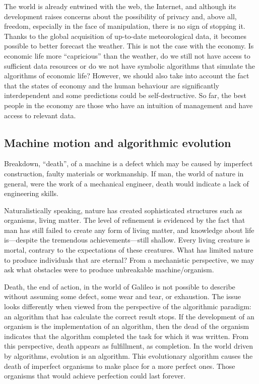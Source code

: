 \documentclass[pdftex,12pt]{article}
\begin{document}
The world is already entwined with the web, the Internet, and although its development raises concerns about the possibility of privacy and, above all, freedom, especially in the face of manipulation, there is no sign of stopping it. Thanks to the global acquisition of up-to-date meteorological data, it becomes possible to better forecast the weather. This is not the case with the economy. Is economic life more ``capricious'' than the weather, do we still not have access to sufficient data resources or do we not have symbolic algorithms that simulate the algorithms of economic life? However, we should also take into account the fact that the states of economy  and the human behaviour are significantly interdependent and some predictions could be self-destructive. So far, the best people in the economy are those who have an intuition of management and have access to relevant data.



\subsection{Machine motion and algorithmic evolution} 

Breakdown, ``death'', of a machine is a defect which may be caused by imperfect construction, faulty materials or workmanship. If man, the world of nature in general, were the work of a mechanical engineer, death would indicate a lack of engineering skills.

Naturalistically speaking, nature has created sophisticated structures such as organisms, living matter. The level of refinement is evidenced by the fact that man has still failed to create any form of living matter, and knowledge about life is---despite the tremendous achievements---still shallow. Every living creature is mortal, contrary to the expectations of these creatures. What has limited nature to produce individuals that are eternal? From a mechanistic perspective, we may ask what obstacles were to produce unbreakable machine/organism.

Death, the end of action, in the  world of Galileo  is not possible to describe without assuming some defect, some wear and tear, or exhaustion. The issue looks differently when viewed from the perspective of the algorithmic paradigm: an algorithm that has calculate  the correct result  stops.  If the development of an organism is the implementation of an algorithm, then the dead of the organism indicates that the algorithm completed the task for which it was written. From this perspective, death appears as fulfillment, as completion. In the world driven by algorithms, evolution is an algorithm. This evolutionary algorithm causes the death of imperfect organisms to make place for a more perfect ones. Those organisms that would achieve perfection could last forever.
\end{document}
